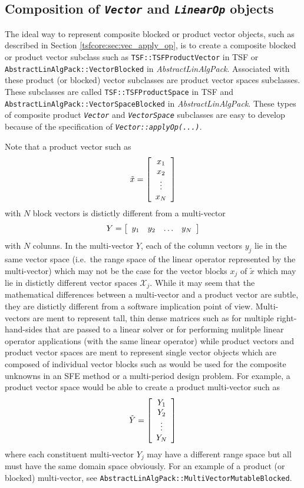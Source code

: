 %
\subsection{Composition of {}\texttt{\textit{Vector}} and {}\texttt{\textit{LinearOp}} objects}
\label{tsfcore:sec:composite_abstractions}
%

The ideal way to represent composite blocked or product vector
objects, such as described in Section
{}\ref{tsfcore:sec:vec_apply_op}, is to create a composite blocked or
product vector subclass such as {}\texttt{TSF\-::TSF\-Product\-Vector}
in TSF or {}\texttt{Abstract\-Lin\-Alg\-Pack\-::Vector\-Blocked} in
{}\textit{Abstract\-Lin\-AlgP\-ack}.  Associated with these product
(or blocked) vector subclasses are product vector spaces subclasses.
These subclasses are called {}\texttt{TSF\-::TSF\-Product\-Space} in
TSF and {}\texttt{Abstract\-Lin\-Alg\-Pack\-::Vector\-Space\-Blocked}
in {}\textit{Abstract\-Lin\-Alg\-Pack}.  These types of composite
product {}\texttt{\textit{Vector}} and {}\texttt{\textit{VectorSpace}}
subclasses are easy to develop because of the specification of
{}\texttt{\textit{Vector\-::applyOp(\-...)}}.

Note that a product vector such as
%
\[
\tilde{x} = {\bmat{c} x_1 \\ x_2 \\ \vdots \\ x_N \emat}
\]
%
with $N$ block vectors is distictly different from a multi-vector
%
\[
Y = {\bmat{cccc} y_1 & y_2 & \ldots & y_N \emat}
\]
%
with $N$ colunns.  In the multi-vector $Y$, each of the column vectors
$y_j$ lie in the same vector space (i.e.~the range space of the linear
operator represented by the multi-vector) which may not be the case
for the vector blocks $x_j$ of $\tilde{x}$ which may lie in distictly
different vector spaces $\mathcal{X}_j$.  While it may seem that the
mathematical differences between a multi-vector and a product vector
are subtle, they are distictly different from a software implication
point of view.  Multi-vectors are ment to represent tall, thin dense
matrices such as for multiple right-hand-sides that are passed to a
linear solver or for performing mulitple linear operator applications
(with the same linear operator) while product vectors and product
vector spaces are ment to represent single vector objects which are
composed of individual vector blocks such as would be used for the
composite unknowns in an SFE method or a multi-period design problem.
For example, a product vector space would be able to create a product
multi-vector such as
%
\[
\tilde{Y} = {\bmat{c} Y_1 \\ Y_2 \\ \vdots \\ Y_N \emat}
\]
%
where each constituent multi-vector $Y_j$ may have a different range
space but all must have the same domain space obviously.  For an
example of a product (or blocked) multi-vector, see
{}\texttt{Abstract\-Lin\-Alg\-Pack\-::Multi\-Vector\-Mutable\-Blocked}.

